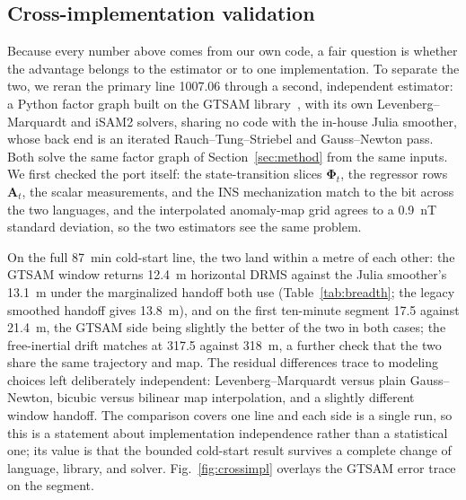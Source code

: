 \documentclass{IEEEtaes}
\begin{document}
\subsection{Cross-implementation validation}
Because every number above comes from our own code, a fair question is whether the
advantage belongs to the estimator or to one implementation. To separate the two, we
reran the primary line 1007.06 through a second, independent estimator: a Python
factor graph built on the GTSAM library~\cite{dellaert2012}, with its own
Levenberg--Marquardt and iSAM2 solvers, sharing no code with the in-house Julia
smoother, whose back end is an iterated Rauch--Tung--Striebel and Gauss--Newton pass.
Both solve the same factor graph of Section~\ref{sec:method} from the same inputs. We
first checked the port itself: the state-transition slices $\boldsymbol{\Phi}_t$, the
regressor rows $\mathbf{A}_t$, the scalar measurements, and the INS mechanization match
to the bit across the two languages, and the interpolated anomaly-map grid agrees to a
\SI{0.9}{\nano\tesla} standard deviation, so the two estimators see the same problem.

On the full \SI{87}{\minute} cold-start line, the two land within a metre of each
other: the GTSAM window returns \SI{12.4}{\meter} horizontal DRMS against the Julia
smoother's \SI{13.1}{\meter} under the marginalized handoff both use
(Table~\ref{tab:breadth}; the legacy smoothed handoff gives \SI{13.8}{\meter}), and on the first ten-minute
segment \num{17.5} against \SI{21.4}{\meter}, the GTSAM side being slightly the better of
the two in both cases; the free-inertial drift matches at \num{317.5} against
\SI{318}{\meter}, a further check that the two share the same trajectory and map. The
residual differences trace to modeling choices left deliberately independent:
Levenberg--Marquardt versus plain Gauss--Newton, bicubic versus bilinear map
interpolation, and a slightly different window handoff. The comparison covers one
line and each side is a single run, so this is a statement about implementation
independence rather than a statistical one; its value is that the bounded cold-start
result survives a complete change of language, library, and solver.
Fig.~\ref{fig:crossimpl} overlays the GTSAM error trace on the segment.
\end{document}
